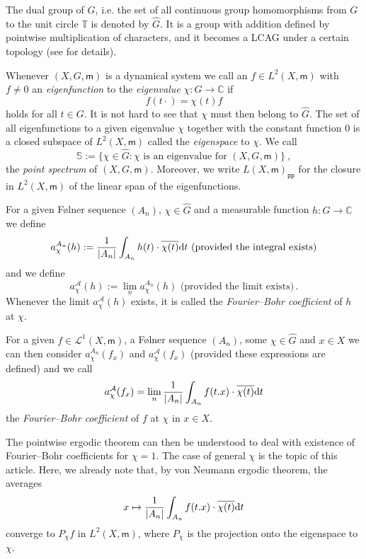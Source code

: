 \documentclass [14pt]{amsart}
\numberwithin{equation}{section}
\newcommand{\CC}{{\mathbb C}}
\newcommand{\TT}{\mathbb T}
\newcommand{\cA}{{\mathcal A}}
\newcommand{\mm}{\mathsf{m}}
\newcommand{\dd}{\mbox{\rm d}}
\newcommand{\SSS}{\mathbb S}
\begin{document}
The dual group of $G$, i.e. the set of all continuous group homomorphisms from $G$ to the unit circle $\TT$ is denoted by $\widehat{G}$.
It is a group with addition defined by pointwise multiplication of characters, and it becomes a LCAG under a certain topology (see \cite[Sect~1.2.6]{Rud} for details).


Whenever $(X,G,\mm)$ is a dynamical system we call an $f\in L^2 (X,\mm)$ with $f\neq 0$ an \textit{eigenfunction} to the \textit{eigenvalue}   $\chi : G\longrightarrow  \CC$ if
$$f(t\cdot) = \chi (t) f$$
holds for all $t\in G$. It is not hard to see that $\chi$ must then belong to $\widehat{G}$.   The set of all eigenfunctions to a given eigenvalue $\chi$ together with the constant function $0$ is a closed subspace of $L^2 (X,\mm)$ called  the \textit{eigenspace} to $\chi$.
We call
\[
\SSS:= \{ \chi \in \widehat{G} : \chi \mbox{ is an eigenvalue for } (X,G,\mm) \} \ ,
\]
the \textit{point spectrum} of $(X, G, \mm)$. Moreover, we write $L(X, \mm)_{\mathsf{pp}}$ for the closure in $L^2(X,\mm)$ of the linear span of the eigenfunctions.

\medskip

For a given F\o lner sequence $(A_n)$, $\chi \in\widehat{G}$ and a measurable function $h : G\longrightarrow \CC$ we define
$$a_\chi^{A_n} (h):=\frac{1}{|A_n|} \int_{A_n} h(t) \cdot \overline{\chi(t)} \dd t \mbox{  (provided  the integral exists)}$$
and we define
$$a_\chi^{\cA} (h):=\lim_n a_\chi^{A_n} (h) \mbox{  (provided  the limit exists)} \,.$$
Whenever  the limit $a_{\chi}^\cA(h)$ exists, it is called the \textit{Fourier--Bohr coefficient} of $h$ at $\chi$.

\smallskip
For  a given $f\in \mathcal{L}^1(X,\mm)$, a F\o lner sequence $(A_n)$, some  $\chi \in \widehat{G}$  and $x\in X$  we can then consider
$a_\chi^{A_n} (f_x)$ and $a_\chi^{\mathcal{A}} (f_x)$ (provided these expressions are defined) and  we  call
$$a_\chi^{\cA} (f_x) = \lim_n \frac{1}{|A_n|}\int_{A_n} f(t.x) \cdot  \overline{\chi(t)} \dd t$$
the \textit{Fourier--Bohr coefficient} of $f$ at $\chi$  in $x\in X$.



The pointwise ergodic theorem can then be understood to deal with existence of Fourier--Bohr coefficients for $\chi =1$. The case  of general $\chi$  is the topic of this article. Here, we  already note that, by von Neumann ergodic theorem,
the averages
$$x\mapsto \frac{1}{|A_n|} \int_{A_n} f(t.x) \cdot \overline{ \chi (t)} \dd t$$
converge to $P_\chi f$ in  $L^2 (X,\mm)$, where $P_\chi$ is the projection onto the eigenspace to $\chi$.
\end{document}
